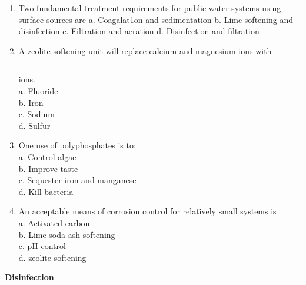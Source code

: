 \documentclass{article}
\begin{document}
\begin{enumerate}
\item Two fundamental treatment requirements for public water systems using surface sources are
a. Coagalat1on and sedimentation
b. Lime softening and disinfection
c. Filtration and aeration 
d. Disinfection and filtration

\item A zeolite softening unit will replace calcium and magnesium ions with \rule{2cm}{0.3pt} ions.\\
a. Fluoride\\
b. Iron\\
c. Sodium\\
d. Sulfur\\

\item One use of polyphosphates is to:\\
a. Control algae\\
b. Improve taste\\
c. Sequester iron and manganese\\
d. Kill bacteria

\item An acceptable means of corrosion control for relatively small systems is\\
a. Activated carbon\\
b. Lime-soda ash softening\\
c. pH control\\
d. zeolite softening

\end{enumerate}
\newpage
\textbf{Disinfection}
\end{document}
